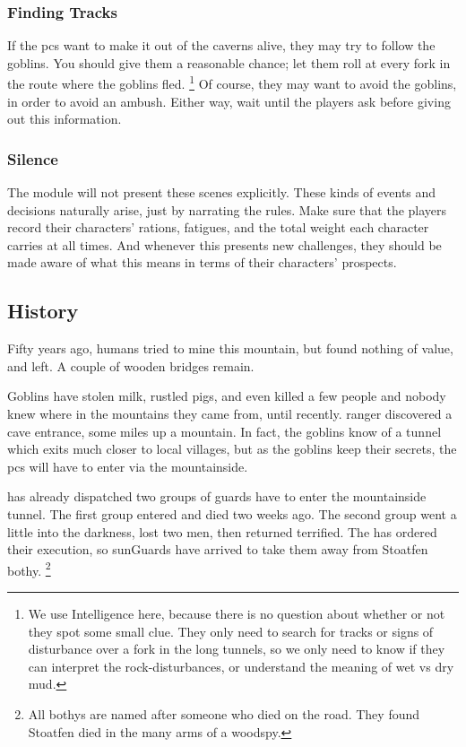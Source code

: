 \begin{multicols}{2}
\subsubsection{Finding Tracks}

If the \glspl{pc} want to make it out of the caverns alive, they may try to follow the goblins.
You should give them a reasonable chance; let them roll  at every fork in the route where the goblins fled.%
\footnote{We use Intelligence here, because there is no question about whether or not they spot some small clue.
They only need to search for tracks or signs of disturbance over a fork in the long tunnels, so we only need to know if they can interpret the rock-disturbances, or understand the meaning of wet vs dry mud.}
Of course, they may want to avoid the goblins, in order to avoid an ambush.
Either way, wait until the players ask before giving out this information.

\subsubsection{Silence}

The module will not present these scenes explicitly.
These kinds of events and decisions naturally arise, just by narrating the rules.
Make sure that the players record their characters' rations, \glspl{fatigue}, and the total \gls{weight} each character carries at all times.
And whenever this presents new challenges, they should be made aware of what this means in terms of their characters' prospects.

\subsection{History}
\label{caves_history}

\noindent
Fifty years ago, humans tried to mine this mountain, but found nothing of value, and left.
A couple of wooden bridges remain.

Goblins have stolen milk, rustled pigs, and even killed a few people and nobody knew where in the mountains they came from, until recently.
 ranger discovered a cave entrance, some miles up a mountain.
In fact, the goblins know of a tunnel which exits much closer to local \glspl{village}, but as the goblins keep their secrets, the \glspl{pc} will have to enter via the mountainside.

 has already dispatched two groups of \glspl{guard} have to enter the mountainside tunnel.
The first group entered and died two weeks ago.
The second group went a little into the darkness, lost two men, then returned terrified.
The  has ordered their execution, so \glspl{sunGuard} have arrived to take them away from Stoatfen \gls{bothy}.%
\footnote{All \glspl{bothy} are named after someone who died on the road.
They found Stoatfen died in the many arms of a woodspy.}

\end{multicols}

